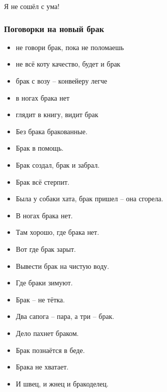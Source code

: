 \begin{epigraph}
    Я не сошёл с ума!\\
\end{epigraph}

\subsubsection{Поговорки на новый брак}

\begin{itemize}
    \item не говори брак, пока не поломаешь
    \item не всё коту качество, будет и брак
    \item брак с возу -- конвейеру легче
    \item в ногах брака нет
    \item глядит в книгу, видит брак
    \item Без брака бракованные.
    \item Брак в помощь.
    \item Брак создал, брак и забрал.
    \item Брак всё стерпит.
    \item Была у собаки хата, брак пришел -- она сгорела.
    \item В ногах брака нет.
    \item Там хорошо, где брака нет.
    \item Вот где брак зарыт.
    \item Вывести брак на чистую воду.
    \item Где браки зимуют.
    \item Брак -- не тётка.
    \item Два сапога -- пара, а три -- брак.
    \item Дело пахнет браком.
    \item Брак познаётся в беде.
    \item Брака не хватает.
    \item И швец, и жнец и бракоделец.
\end{itemize}



